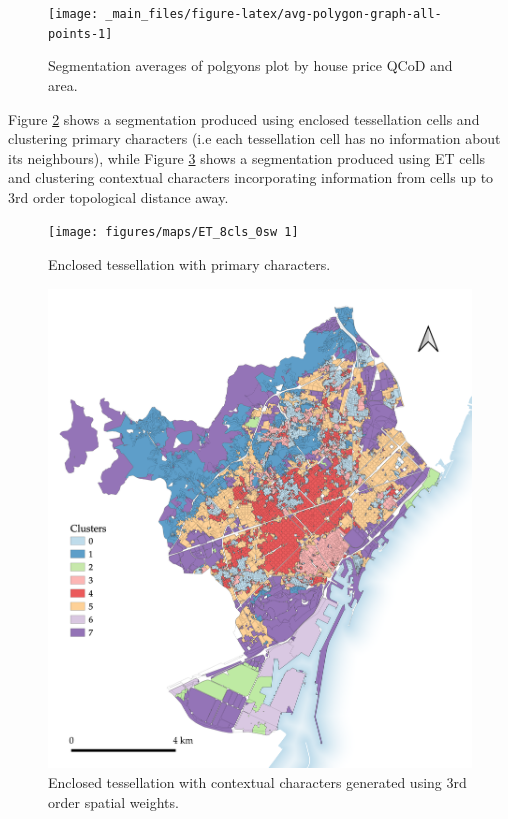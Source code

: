 \documentclass[a4paper, nobind]{templates/ociamthesis}
\begin{document}
\begin{figure}
\texttt{[image: \_main\_files/figure-latex/avg-polygon-graph-all-points-1]} \caption{Segmentation averages of polgyons plot by house price QCoD and area.}\label{fig:avg-polygon-graph-all-points}
\end{figure}

Figure \ref{fig:0sw-map-BCN} shows a segmentation produced using enclosed tessellation cells and clustering primary characters (i.e each tessellation cell has no information about its neighbours), while Figure \ref{fig:3sw-map-BCN} shows a segmentation produced using ET cells and clustering contextual characters incorporating information from cells up to 3rd order topological distance away.

\begin{figure}

{\centering \texttt{[image: figures/maps/ET\_8cls\_0sw 1]} 

}

\caption[Enclosed tessellation with primary characters.]{Enclosed tessellation with primary characters.}\label{fig:0sw-map-BCN}
\end{figure}

\begin{figure}

{\centering \includegraphics[width=.8\paperwidth]{figures/maps/ET_8cls_3sw 3} 

}

\caption[Enclosed tessellation with 3rd order contextual characters.]{Enclosed tessellation with contextual characters generated using 3rd order spatial weights.}\label{fig:3sw-map-BCN}
\end{figure}
\end{document}
